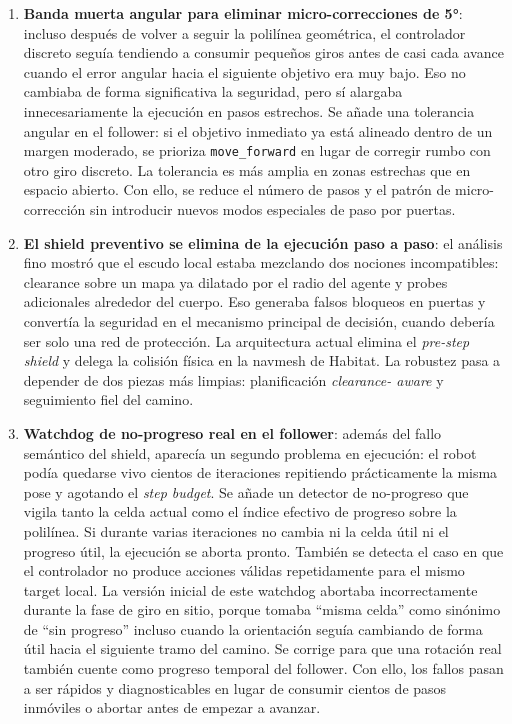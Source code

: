 \documentclass[11pt,a4paper]{article}
\begin{document}
\begin{enumerate}
  \item \textbf{Banda muerta angular para eliminar micro-correcciones de 5°}:
        incluso después de volver a seguir la polilínea geométrica, el
        controlador discreto seguía tendiendo a consumir pequeños giros antes
        de casi cada avance cuando el error angular hacia el siguiente objetivo
        era muy bajo. Eso no cambiaba de forma significativa la seguridad, pero
        sí alargaba innecesariamente la ejecución en pasos estrechos. Se añade
        una tolerancia angular en el follower: si el objetivo inmediato ya está
        alineado dentro de un margen moderado, se prioriza
        \texttt{move\_forward} en lugar de corregir rumbo con otro giro
        discreto. La tolerancia es más amplia en zonas estrechas que en espacio
        abierto. Con ello, se reduce el número de pasos y el patrón de
        micro-corrección sin introducir nuevos modos especiales de paso por
        puertas.

  \item \textbf{El shield preventivo se elimina de la ejecución paso a paso}:
        el análisis fino mostró que el escudo local estaba mezclando dos
        nociones incompatibles: clearance sobre un mapa ya dilatado por el
        radio del agente y probes adicionales alrededor del cuerpo. Eso
        generaba falsos bloqueos en puertas y convertía la seguridad en el
        mecanismo principal de decisión, cuando debería ser solo una red de
        protección. La arquitectura actual elimina el \textit{pre-step shield}
        y delega la colisión física en la navmesh de Habitat. La robustez pasa
        a depender de dos piezas más limpias: planificación \textit{clearance-
        aware} y seguimiento fiel del camino.

  \item \textbf{Watchdog de no-progreso real en el follower}: además del fallo
        semántico del shield, aparecía un segundo problema en ejecución: el
        robot podía quedarse vivo cientos de iteraciones repitiendo
        prácticamente la misma pose y agotando el \textit{step budget}. Se
        añade un detector de no-progreso que vigila tanto la celda actual como
        el índice efectivo de progreso sobre la polilínea. Si durante varias
        iteraciones no cambia ni la celda útil ni el progreso útil, la
        ejecución se aborta pronto. También se detecta el caso en que el
        controlador no produce acciones válidas repetidamente para el mismo
        target local. La versión inicial de este watchdog abortaba
        incorrectamente durante la fase de giro en sitio, porque tomaba
        ``misma celda'' como sinónimo de ``sin progreso'' incluso cuando la
        orientación seguía cambiando de forma útil hacia el siguiente tramo del
        camino. Se corrige para que una rotación real también cuente como
        progreso temporal del follower. Con ello, los fallos pasan a ser
        rápidos y diagnosticables en lugar de consumir cientos de pasos
        inmóviles o abortar antes de empezar a avanzar.


\end{enumerate}
\end{document}
